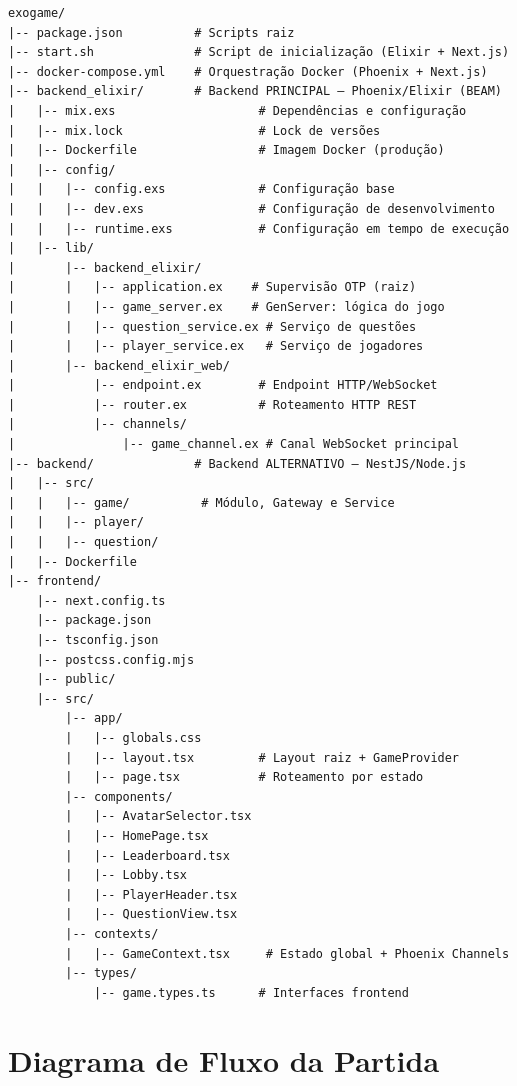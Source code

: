 \documentclass[
	12pt,
	openany,
	oneside,
	a4paper,
	english,
	brazil
]{abntex2}
\begin{document}
\begin{apendicesenv}
\begin{lstlisting}[language={}, caption={Estrutura de diretórios do projeto ExoGame}, label={lst:diretorios}]
exogame/
|-- package.json          # Scripts raiz
|-- start.sh              # Script de inicialização (Elixir + Next.js)
|-- docker-compose.yml    # Orquestração Docker (Phoenix + Next.js)
|-- backend_elixir/       # Backend PRINCIPAL – Phoenix/Elixir (BEAM)
|   |-- mix.exs                    # Dependências e configuração
|   |-- mix.lock                   # Lock de versões
|   |-- Dockerfile                 # Imagem Docker (produção)
|   |-- config/
|   |   |-- config.exs             # Configuração base
|   |   |-- dev.exs                # Configuração de desenvolvimento
|   |   |-- runtime.exs            # Configuração em tempo de execução
|   |-- lib/
|       |-- backend_elixir/
|       |   |-- application.ex    # Supervisão OTP (raiz)
|       |   |-- game_server.ex    # GenServer: lógica do jogo
|       |   |-- question_service.ex # Serviço de questões
|       |   |-- player_service.ex   # Serviço de jogadores
|       |-- backend_elixir_web/
|           |-- endpoint.ex        # Endpoint HTTP/WebSocket
|           |-- router.ex          # Roteamento HTTP REST
|           |-- channels/
|               |-- game_channel.ex # Canal WebSocket principal
|-- backend/              # Backend ALTERNATIVO – NestJS/Node.js
|   |-- src/
|   |   |-- game/          # Módulo, Gateway e Service
|   |   |-- player/
|   |   |-- question/
|   |-- Dockerfile
|-- frontend/
    |-- next.config.ts
    |-- package.json
    |-- tsconfig.json
    |-- postcss.config.mjs
    |-- public/
    |-- src/
        |-- app/
        |   |-- globals.css
        |   |-- layout.tsx         # Layout raiz + GameProvider
        |   |-- page.tsx           # Roteamento por estado
        |-- components/
        |   |-- AvatarSelector.tsx
        |   |-- HomePage.tsx
        |   |-- Leaderboard.tsx
        |   |-- Lobby.tsx
        |   |-- PlayerHeader.tsx
        |   |-- QuestionView.tsx
        |-- contexts/
        |   |-- GameContext.tsx     # Estado global + Phoenix Channels
        |-- types/
            |-- game.types.ts      # Interfaces frontend
\end{lstlisting}

\chapter{Diagrama de Fluxo da Partida}\label{ap:fluxo}


\end{apendicesenv}
\end{document}
